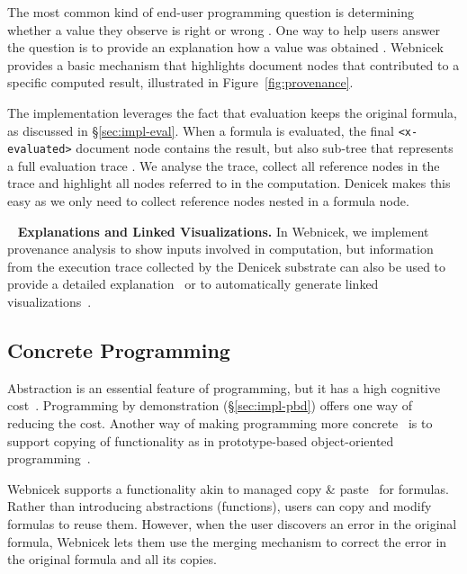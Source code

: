 \documentclass[sigconf,anonymous,screen]{acmart}
\DeclareRobustCommand{\keyideabox}[3]{\begin{tcolorbox}[breakable,
  boxsep=5pt,left=0pt,right=0pt,top=0pt,bottom=0pt,width=\dimexpr\columnwidth\relax,
  colback=gray!20,colframe=gray!20,
  enlarge bottom by=0pt,enlarge top by=0pt,
  arc=0pt,outer arc=0pt]
\lettrine[lraise=0.3]{\LARGE #1}{~}
\small \textbf{#2.} #3
\end{tcolorbox}
}
\begin{document}
The most common kind of end-user programming question is determining whether a value they observe
is right or wrong \cite{kissinger-2006-debugging}. One way to help users answer the question is
to provide an explanation how a value was obtained \cite{ko-2009-whyline}. Webnicek provides a basic
mechanism that highlights document nodes that contributed to a specific computed result,
illustrated in Figure~\ref{fig:provenance}.

The implementation leverages the fact that evaluation keeps the original formula, as discussed
in \S\ref{sec:impl-eval}. When a formula is evaluated, the final {\small\Verb_<x-evaluated>_}
document node contains the result, but also sub-tree that represents a full evaluation trace
\cite{perera-2012-functional}. We analyse the trace, collect all reference nodes in the trace and
highlight all nodes referred to in the computation. Denicek makes this easy as we
only need to collect reference nodes nested in a formula node.

\keyideabox{\faBarChart}{Explanations and Linked Visualizations}{In Webnicek, we implement
provenance analysis to show inputs involved in computation, but information from the execution
trace collected by the Denicek substrate can also be used to provide a detailed
explanation~\cite{perera-2012-functional} or to automatically generate linked visualizations~\cite{perera-2022-linked}.}


\subsection{Concrete Programming}
\label{sec:impl-copy}

Abstraction is an essential feature of programming, but it has a high cognitive
cost~\cite{blackwell-2002-attention}. Programming by demonstration (\S\ref{sec:impl-pbd})
offers one way of reducing the cost. Another way of making programming more
concrete~\cite{edwards-2004-example,smith-1975-pygmalion} is to support copying of functionality
as in prototype-based object-oriented programming~\cite{randall-1995-self}.

Webnicek supports a functionality akin to managed copy \&
paste~\cite{edwards-2006-copypaste,edwards-2022-copypaste} for formulas. Rather than introducing
abstractions (functions), users can copy and modify formulas to reuse them. However, when the user
discovers an error in the original formula, Webnicek lets them use the merging mechanism to correct
the error in the original formula and all its copies.
\end{document}
